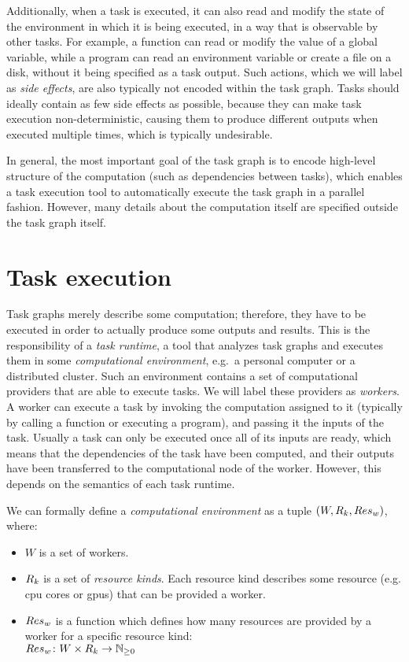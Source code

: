 Additionally, when a task is executed, it can also read and modify the state of the environment in
which it is being executed, in a way that is observable by other tasks. For example, a function can
read or modify the value of a global variable, while a program can read an environment variable or
create a file on a disk, without it being specified as a task output. Such actions, which we will
label as \emph{side effects}, are also typically not encoded within the task graph. Tasks should
ideally contain as few side effects as possible, because they can make task execution
non-deterministic, causing them to produce different outputs when executed multiple times, which is
typically undesirable.

In general, the most important goal of the task graph is to encode high-level structure of the
computation (such as dependencies between tasks), which enables a task execution tool to
automatically execute the task graph in a parallel fashion. However, many details about the
computation itself are specified outside the task graph itself.

\section{Task execution}
Task graphs merely describe some computation; therefore, they have to be executed in order to
actually produce some outputs and results. This is the responsibility of a \emph{task runtime},
a tool that analyzes task graphs and executes them in some \emph{computational environment}, e.g.\ a personal
computer or a distributed cluster. Such an environment contains a set of computational providers
that are able to execute tasks. We will label these providers as \emph{workers}. A worker
can execute a task by invoking the computation assigned to it (typically by calling a function or
executing a program), and passing it the inputs of the task. Usually a task can only be executed
once all of its inputs are ready, which means that the dependencies of the task have been computed,
and their outputs have been transferred to the computational node of the worker. However, this
depends on the semantics of each task runtime.

We can formally define a \emph{computational environment} as a tuple $(W, R_k, Res_w)$,
where:
\begin{itemize}[itemsep=0pt]
	\item $W$ is a set of workers.
	\item $R_k$ is a set of \emph{resource kinds}. Each resource kind describes some
	      resource (e.g. \gls{cpu} cores or \glspl{gpu})
	      that can be provided a worker.
	\item[\makedef{def:worker_resources}] $Res_w$ is a function which defines how many resources are
	provided by a worker for a specific resource kind: \\ $Res_w\colon W \times R_k \rightarrow \mathbb{N}_{\geq{}0}$
\end{itemize}

